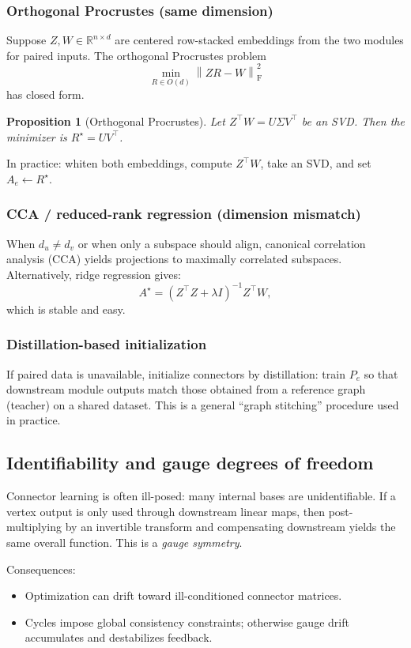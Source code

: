 \documentclass[11pt]{article}
\theoremstyle{definition}
\theoremstyle{plain}
\newtheorem{proposition}{Proposition}[section]
\theoremstyle{remark}
\newcommand{\R}{\mathbb{R}}
\newcommand{\Frob}[1]{\left\lVert #1 \right\rVert_{\mathrm{F}}}
\begin{document}
\subsubsection{Orthogonal Procrustes (same dimension)}
Suppose $Z,W\in \R^{n\times d}$ are centered row-stacked embeddings from the two modules for paired inputs.
The orthogonal Procrustes problem
\[
\min_{R\in O(d)} \Frob{ZR-W}^2
\]
has closed form.

\begin{proposition}[Orthogonal Procrustes]
Let $Z^\top W = U\Sigma V^\top$ be an SVD.
Then the minimizer is $R^\star=UV^\top$.
\end{proposition}

In practice: whiten both embeddings, compute $Z^\top W$, take an SVD, and set $A_e\leftarrow R^\star$.

\subsubsection{CCA / reduced-rank regression (dimension mismatch)}
When $d_u\neq d_v$ or when only a subspace should align, canonical correlation analysis (CCA) yields projections to maximally correlated subspaces.
Alternatively, ridge regression gives:
\[
A^\star = (Z^\top Z + \lambda I)^{-1} Z^\top W,
\]
which is stable and easy.

\subsubsection{Distillation-based initialization}
If paired data is unavailable, initialize connectors by distillation:
train $P_e$ so that downstream module outputs match those obtained from a reference graph (teacher) on a shared dataset.
This is a general ``graph stitching'' procedure used in practice.

\subsection{Identifiability and gauge degrees of freedom}
\label{sec:gauge-freedom}

Connector learning is often ill-posed: many internal bases are unidentifiable.
If a vertex output is only used through downstream linear maps, then post-multiplying by an invertible transform and compensating downstream yields the same overall function.
This is a \emph{gauge symmetry}.

Consequences:
\begin{itemize}[leftmargin=2em]
\item Optimization can drift toward ill-conditioned connector matrices.
\item Cycles impose global consistency constraints; otherwise gauge drift accumulates and destabilizes feedback.
\end{itemize}
\end{document}

